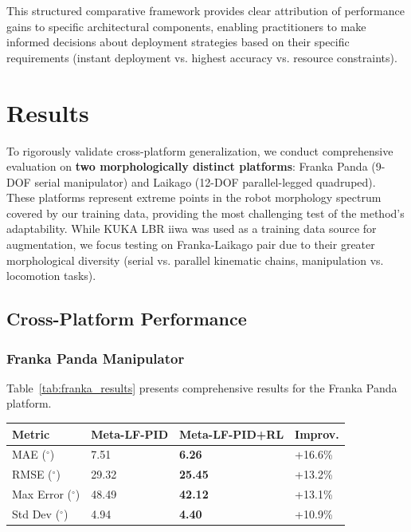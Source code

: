 \documentclass[DTMColor]{ROB-New}
\begin{document}
This structured comparative framework provides clear attribution of performance gains to specific architectural components, enabling practitioners to make informed decisions about deployment strategies based on their specific requirements (instant deployment vs. highest accuracy vs. resource constraints).

\section{Results}
\label{sec:results}

To rigorously validate cross-platform generalization, we conduct comprehensive evaluation on \textbf{two morphologically distinct platforms}: Franka Panda (9-DOF serial manipulator) and Laikago (12-DOF parallel-legged quadruped). These platforms represent extreme points in the robot morphology spectrum covered by our training data, providing the most challenging test of the method's adaptability. While KUKA LBR iiwa was used as a training data source for augmentation, we focus testing on Franka-Laikago pair due to their greater morphological diversity (serial vs. parallel kinematic chains, manipulation vs. locomotion tasks).

\FloatBarrier
\subsection{Cross-Platform Performance}

\subsubsection{Franka Panda Manipulator}

Table~\ref{tab:franka_results} presents comprehensive results for the Franka Panda platform.

\begin{table}[h]
{\begin{fntable}\centering
\begin{tabular}{@{\extracolsep{\fill}}llll}
\hline
\textbf{Metric} & \textbf{Meta-LF-PID} & \textbf{Meta-LF-PID+RL} & \textbf{Improv.} \\
\hline
MAE ($^\circ$) & 7.51 & \textbf{6.26} & +16.6\% \\
RMSE ($^\circ$) & 29.32 & \textbf{25.45} & +13.2\% \\
Max Error ($^\circ$) & 48.49 & \textbf{42.12} & +13.1\% \\
Std Dev ($^\circ$) & 4.94 & \textbf{4.40} & +10.9\% \\
\hline
\end{tabular}
\end{fntable}}
\end{table}
\end{document}
